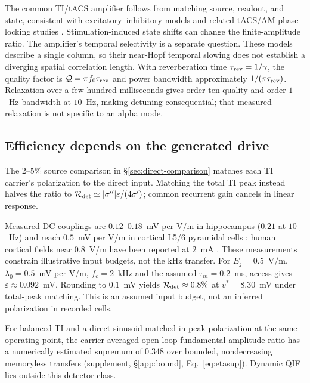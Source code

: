 \documentclass[a4paper]{article}
\newcommand{\Sig}{\sigma}
\begin{document}
The common TI/tACS amplifier follows from matching source, readout, and state, consistent with excitatory--inhibitory models \cite{ledoux2011,clusella2023} and related tACS/AM phase-locking studies \cite{ali2013,negahbani2018,krause2023}. Stimulation-induced state shifts can change the finite-amplitude ratio. The amplifier's temporal selectivity is a separate question. These models describe a single column, so their near-Hopf temporal slowing does not establish a diverging spatial correlation length. With reverberation time $\tau_{\rm rev}=1/\gamma$, the quality factor is $\mathcal Q=\pi f_0\tau_{\rm rev}$ and power bandwidth approximately $1/(\pi\tau_{\rm rev})$. Relaxation over a few hundred milliseconds \cite{wilting2018} gives order-ten quality and order-$1$~Hz bandwidth at $10$~Hz, making detuning consequential; that measured relaxation is not specific to an alpha mode.

\subsection{Efficiency depends on the generated drive}
The $2$--$5\%$ source comparison in \S\ref{sec:direct-comparison} matches each
TI carrier's polarization to the direct input. Matching the total TI peak instead halves the
ratio to $\mathcal R_{\rm det}\simeq|\Sig''|\varepsilon/(4\Sig')$; common
recurrent gain cancels in linear response.

Measured DC couplings are $0.12$--$0.18$~mV per V/m in hippocampus ($0.21$ at $10$~Hz)
\cite{bikson2004,deans2007} and reach $0.5$~mV per V/m in cortical L5/6 pyramidal
cells \cite{radman2009}; human cortical fields near $0.8$~V/m have been reported
at $2$~mA \cite{huang2017,huang2017corr}. These measurements constrain illustrative
input budgets, not the kHz transfer. For $E_j=0.5$~V/m,
$\lambda_0=0.5$~mV per V/m, $f_c=2$~kHz and the assumed $\tau_m=0.2$~ms, access
gives $\varepsilon\approx0.092$~mV. Rounding to $0.1$~mV yields
$\mathcal R_{\rm det}\approx0.8\%$ at $v^*=8.30$~mV under total-peak matching.
This is an assumed input budget, not an inferred polarization in recorded cells.

For balanced TI and a direct sinusoid matched in peak polarization at the same
operating point, the carrier-averaged open-loop fundamental-amplitude ratio
has a numerically estimated supremum of $0.348$ over bounded,
nondecreasing memoryless transfers (supplement, \S\ref{app:bound},
Eq.~\eqref{eq:etasup}). Dynamic QIF lies outside this detector class.
\end{document}

